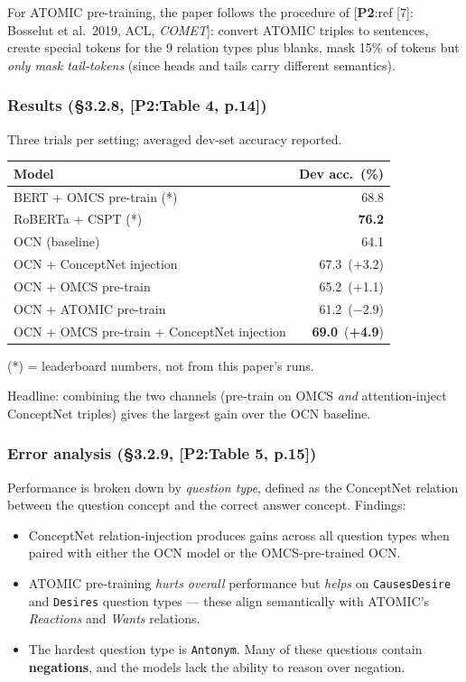 \documentclass[11pt, a4paper]{article}
\newcommand{\thead}[1]{\textbf{#1}}
\newcommand{\paperref}[1]{\textcolor{srcBd}{\small[\textbf{P2}:#1]}}
\begin{document}
For ATOMIC pre-training, the paper follows the procedure of \paperref{ref [7]: Bosselut et al.\ 2019, ACL, \emph{COMET}}: convert ATOMIC triples to sentences, create special tokens for the 9 relation types plus blanks, mask 15\% of tokens but \emph{only mask tail-tokens} (since heads and tails carry different semantics).

\subsubsection*{Results (§3.2.8, \paperref{Table 4, p.14})}
Three trials per setting; averaged dev-set accuracy reported.

\begin{center}\small
\begin{tabular}{lr}
\toprule
\thead{Model} & \thead{Dev acc.\ (\%)}\\
\midrule
BERT + OMCS pre-train (*) & 68.8 \\
RoBERTa + CSPT (*) & \textbf{76.2} \\
\midrule
OCN (baseline) & 64.1 \\
OCN + ConceptNet injection & 67.3 \,(+3.2) \\
OCN + OMCS pre-train & 65.2 \,(+1.1) \\
OCN + ATOMIC pre-train & 61.2 \,(\(-2.9\)) \\
OCN + OMCS pre-train + ConceptNet injection & \textbf{69.0} \,(\textbf{+4.9}) \\
\bottomrule
\end{tabular}
\end{center}
\footnotesize{(*) = leaderboard numbers, not from this paper's runs.}\normalsize

Headline: combining the two channels (pre-train on OMCS \emph{and} attention-inject ConceptNet triples) gives the largest gain over the OCN baseline.

\subsubsection*{Error analysis (§3.2.9, \paperref{Table 5, p.15})}
Performance is broken down by \emph{question type}, defined as the ConceptNet relation between the question concept and the correct answer concept. Findings:

\begin{itemize}
  \item ConceptNet relation-injection produces gains across all question types when paired with either the OCN model or the OMCS-pre-trained OCN.
  \item ATOMIC pre-training \emph{hurts overall} performance but \emph{helps} on \texttt{CausesDesire} and \texttt{Desires} question types — these align semantically with ATOMIC's \emph{Reactions} and \emph{Wants} relations.
  \item The hardest question type is \texttt{Antonym}. Many of these questions contain \textbf{negations}, and the models lack the ability to reason over negation.
\end{itemize}
\end{document}
